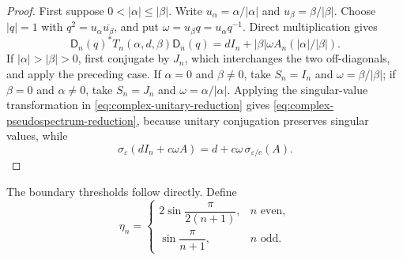 \documentclass[10pt,twoside]{siamart1116}
\numberwithin{equation}{section}
\begin{document}
\begin{proof}
First suppose \(0<|\alpha|\leq|\beta|\).  Write
\(u_\alpha=\alpha/|\alpha|\) and \(u_\beta=\beta/|\beta|\).  Choose
\(|q|=1\) with \(q^2=u_\alpha\overline{u_\beta}\), and put
\(\omega=u_\beta q=u_\alpha q^{-1}\).  Direct multiplication gives
\[
 \mathsf D_n(q)^*T_n(\alpha,d,\beta)\mathsf D_n(q)
 =dI_n+|\beta|\omega A_n(|\alpha|/|\beta|).
\]
If \(|\alpha|>|\beta|>0\), first conjugate by \(J_n\), which interchanges
the two off-diagonals, and apply the preceding case.  If \(\alpha=0\) and
\(\beta\ne0\), take \(S_n=I_n\) and \(\omega=\beta/|\beta|\); if
\(\beta=0\) and \(\alpha\ne0\), take \(S_n=J_n\) and
\(\omega=\alpha/|\alpha|\).  Applying the singular-value transformation in
\eqref{eq:complex-unitary-reduction} gives
\eqref{eq:complex-pseudospectrum-reduction}, because unitary conjugation
preserves singular values, while
\[
 \sigma_\varepsilon(dI_n+c\omega A)
 =d+c\omega\,\sigma_{\varepsilon/c}(A).
\]
\end{proof}

The boundary thresholds follow directly.  Define
\begin{equation}\label{eq:normal-threshold}
 \eta_n=
 \begin{cases}
  2\sin\dfrac{\pi}{2(n+1)},&n\text{ even},\\[6pt]
  \sin\dfrac{\pi}{n+1},&n\text{ odd}.
 \end{cases}
\end{equation}

\end{document}
